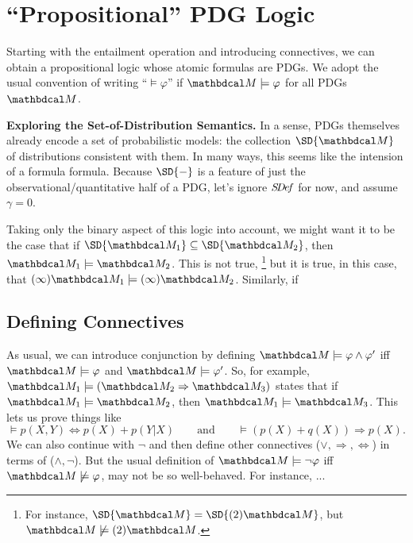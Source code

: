 \section{``Propositional'' PDG Logic}
Starting with the entailment operation and introducing connectives, we 
can obtain a propositional logic whose atomic formulas are PDGs. 
We  adopt the usual convention of writing 
``$\models \varphi$'' if $\dg M \models \varphi$ for all PDGs $\dg M$. 

\textbf{Exploring the Set-of-Distribution Semantics.}
In a sense, PDGs themselves already encode a set of probabilistic models: the 
collection $\SD{\dg M}$ of distributions consistent with them. In many
ways, this seems like the intension of a formula formula.  
Because $\SD{-}$ is a feature of just the observational/quantitative
half of a PDG, let's ignore $\mathit{S\mskip-3.5muD\mskip-2.5mue\mskip-1.5muf}$ for now, and assume $\gamma = 0$. 

Taking only the binary aspect of this logic into account, we might want
it to be the case that if $\SD{\dg M_1} \subseteq \SD{\dg M_2}$, then
$\dg M_1 \models \dg M_2$. This is not true,%
    \footnote{For instance, $\SD{\dg M} = \SD{(2) \dg M}$, but $\dg M \not\models (2) \dg M$.}
but it is true, in this case, that
$(\infty) \dg M_1 \models (\infty) \dg M_2$. 
Similarly, if 


\subsection{Defining Connectives}

As usual, we can introduce conjunction by
    defining $\dg M \models \varphi \land \varphi'$ iff
    $\dg M \models \varphi$ and $\dg M \models \varphi'$.
So, for example, 
    $\dg M_1 \models (\dg M_2 \Rightarrow \dg M_3)$
    states that if $\dg M_1 \models \dg M_2$, then $\dg M_1 \models \dg M_3$. 
    This lets us prove things like
    \[
        \models p(X,Y) \Leftrightarrow p(X) + p(Y|X)
        \qquad
        \text{and}
        \qquad
        \models (p(X) + q(X)) \Rightarrow p(X).
    \]
We can also continue with $\lnot$ and then define other connectives
    ($\lor, \Rightarrow, \Leftrightarrow$) in terms of ($\land, \lnot$).    
But the usual definition of $\dg M \models \lnot \varphi$ iff 
    $\dg M \not\models \varphi$,
    may not be so well-behaved.
For instance, ...

